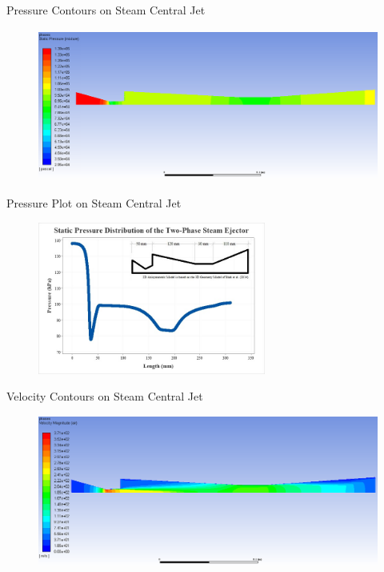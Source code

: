 \begin{frame}{Pressure Contours on Steam Central Jet}
    \begin{figure}
        \centering
        \label{fig:pressurecontoursmeshref3}
        \includegraphics[height=5cm]{images/PressureContour.PNG}
    \end{figure}
\end{frame}

\begin{frame}{Pressure Plot on Steam Central Jet}
   \begin{figure}
    \centering
    \label{fig:pressureplot}
    \includegraphics[height=5cm]{images/PressurePlot.jpg}
   \end{figure}
\end{frame}

\begin{frame}{Velocity Contours on Steam Central Jet}
    \begin{figure}
        \centering
        \includegraphics[height=5cm]{images/sjcentralairvel.png}
    \end{figure}
\end{frame}


